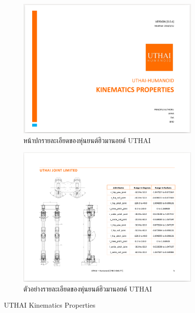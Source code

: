 \begin{figure}[!ht]
    \centering
    \begin{subfigure}[b]{0.45\textwidth}
        \centering
        \includegraphics[width=\textwidth]{chapter4/images/uthai_manual/uthai_kinematics.png}
        \caption{หน้าปกรายละเอียดของหุ่นยนต์ฮิวมานอยด์ UTHAI}
    \end{subfigure}
    \hfill
    \begin{subfigure}[b]{0.45\textwidth}
        \centering
        \includegraphics[width=\textwidth]{chapter4/images/uthai_manual/uthai_kinematics2.png}
        \caption{ตัวอย่างรายละเอียดของหุ่นยนต์ฮิวมานอยด์ UTHAI}
    \end{subfigure}
    \caption{UTHAI Kinematics Properties}
	\label{fig:uthai_kinematics_manual}
\end{figure}
